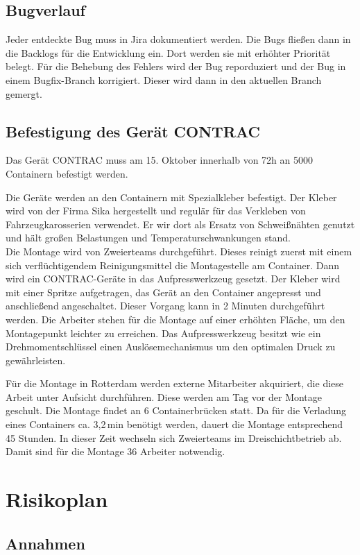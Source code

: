 \subsection{Bugverlauf}
Jeder entdeckte Bug muss in Jira dokumentiert werden. Die Bugs fließen dann in die Backlogs für die Entwicklung ein. Dort werden sie mit erhöhter Priorität belegt.
Für die Behebung des Fehlers wird der Bug reporduziert und der Bug in einem Bugfix-Branch korrigiert. Dieser wird dann in den aktuellen Branch gemergt.


\subsection{Befestigung des Gerät CONTRAC}
Das Gerät CONTRAC muss am 15. Oktober innerhalb von 72h an 5000 Containern befestigt werden.

Die Geräte werden an den Containern mit Spezialkleber befestigt. Der Kleber wird von der Firma Sika hergestellt und regulär für das Verkleben von Fahrzeugkarosserien verwendet. Er wir dort als Ersatz von Schweißnähten genutzt und hält großen Belastungen und Temperaturschwankungen stand.\\
Die Montage wird von Zweierteams durchgeführt. Dieses reinigt zuerst mit einem sich verflüchtigendem Reinigungsmittel die Montagestelle am Container. Dann wird ein CONTRAC-Geräte in das Aufpresswerkzeug gesetzt. Der Kleber wird mit einer Spritze aufgetragen, das Gerät an den Container angepresst und anschließend angeschaltet. Dieser Vorgang kann in 2 Minuten durchgeführt werden. Die Arbeiter stehen für die Montage auf einer erhöhten Fläche, um den Montagepunkt leichter zu erreichen. Das Aufpresswerkzeug besitzt wie ein Drehmomentschlüssel einen Auslösemechanismus um den optimalen Druck zu gewährleisten.

Für die Montage in Rotterdam werden externe Mitarbeiter akquiriert, die diese Arbeit unter Aufsicht durchführen. Diese werden am Tag vor der Montage geschult. Die Montage findet an 6 Containerbrücken statt. Da für die Verladung eines Containers ca. 3,2\,min benötigt werden, dauert die Montage entsprechend 45 Stunden. In dieser Zeit wechseln sich Zweierteams im Dreischichtbetrieb ab. Damit sind für die Montage 36 Arbeiter notwendig.


\section{Risikoplan}
\subsection{Annahmen} %


